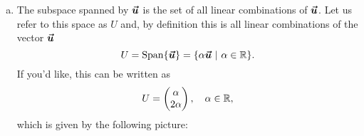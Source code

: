 \documentclass[12pt]{article} %
\newcommand{\Span}{\operatorname{Span}}
\begin{document}
\begin{solution}
\begin{enumerate}[(a)]
\begin{center}
\begin{tikzpicture}
        \end{tikzpicture}
        \end{center}
\item The subspace spanned by $\vecu$ is the set of all linear combinations of $\vecu$. Let us refer to this space as $U$ and, by definition this is all linear combinations of the vector $\vecu$
\[
U = \Span\{\vecu\} = \{ \alpha \vecu ~\vert~ \alpha \in \R\}.
\]
If you'd like, this can be written as
\[
U = \begin{pmatrix} \alpha \\ 2\alpha \end{pmatrix}, \quad \alpha \in \R,
\]
which is given by the following picture:
    \begin{center}
        \end{center}
\end{enumerate}
\end{solution}
\end{document}
